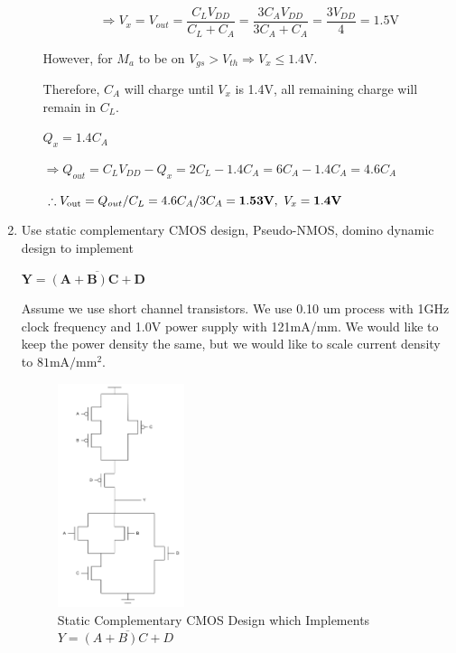 \documentclass[fleqn]{article}
\begin{document}
\begin{enumerate}
\begin{enumerate}
			\begin{equation*}
				\Rightarrow V_x = V_{out} = \frac{C_LV_{DD}}{C_L + C_A} = \frac{3C_AV_{DD}}{3C_A + C_A} = \frac{3V_{DD}}{4} = 1.5\text{V}
			\end{equation*}
			
			 However, for $M_a$ to be on $V_{gs} > V_{th} \Rightarrow V_x \leq 1.4\text{V}$.
			
			Therefore, $C_A$ will charge until $V_x$ is 1.4V, all remaining charge will remain in $C_L$.
			
			$Q_x = 1.4C_A$
			
			$\Rightarrow Q_{out} = C_LV_{DD} - Q_x = 2C_L - 1.4C_A = 6C_A - 1.4C_A = 4.6C_A$
			
			$\therefore V_\text{out} = Q_{out}/C_L = 4.6C_A/3C_A = \mathbf{1.53\text{\textbf{V}}},\ V_x = \mathbf{1.4\text{\textbf{V}}}$
			
			\end{enumerate}
		
		\item Use static complementary CMOS design, Pseudo-NMOS, domino dynamic design to implement
		
		$\mathbf{Y = \overline{(A + B)C + D}}$
		
		Assume we use short channel transistors. We use 0.10 um process with 1GHz clock frequency and 1.0V power supply with 121mA/mm. We would like to keep the power density the same, but we would like to scale current density to $81\text{mA}/\text{mm}^2$.
		
		\begin{figure}[H]
			\centerline{\includegraphics[width=0.35\textwidth]{problem2_static_cmos.png}}
			\caption{Static Complementary CMOS Design which Implements $Y = \overline{(A + B)C + D}$}
			\label{fig::problem2_static_cmos}
		\end{figure}


\end{enumerate}
\end{document}
